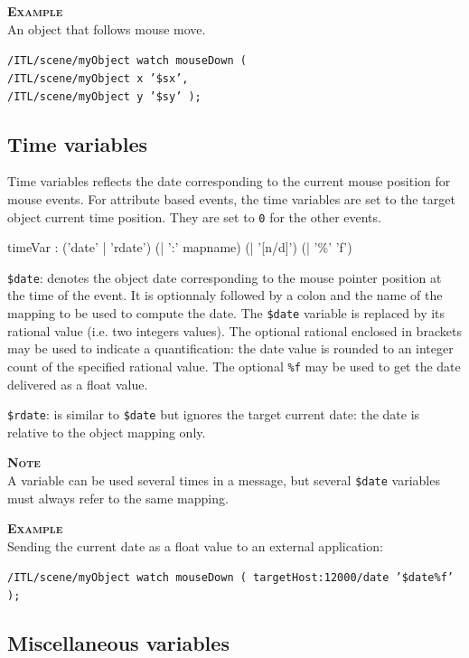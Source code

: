 \documentclass[a4paper,twoside]{report}
\newcommand{\subsublevel}[1]	{\subsection{#1}}
\newcommand{\OSC}[1]		{\texttt{#1}}
\newcommand{\values}[1]		{\texttt{#1}}
\newcommand{\example}		{\textbf{\hspace{-1.5cm}\textbf{\textsc{Example }}}}
\newcommand{\note}	[1]		{\vspace{2mm}\textbf{\hspace{-0.9cm}\textbf{\textsc{Note #1}}}}
\let\olditemize\itemize
\let\oldenditemize\enditemize
\renewenvironment{itemize} 	{\olditemize \setlength{\itemsep}{1mm}}{\oldenditemize}
\newcommand{\sample}	[1]			{\vspace{-2mm}\begin{center}\colorbox{mygrey}{
								\begin{minipage}[t]{0.9\columnwidth} 
								{\small \texttt{#1}}
								\end{minipage}}\end{center}}
\begin{document}
\example \\
An object that follows mouse move.\\
\sample{/ITL/scene/myObject watch mouseDown ( \\
\hspace*{3cm}/ITL/scene/myObject x '\$sx', \\
\hspace*{3cm}/ITL/scene/myObject y '\$sy' );}


\subsublevel{Time variables}
\label{timevar}

Time variables reflects the date corresponding to the current mouse position for mouse events. For attribute based events, the time variables are set to the target object current time position.
They are set to \values{0} for the other events. 

\begin{rail} 
timeVar :  ('date' | 'rdate') (| ':'  mapname) (| '[n/d]') (| '\%' 'f')
\end{rail}

\begin{itemize}
\item \OSC{\$date}: denotes the object date corresponding to the mouse pointer position at the time of the event. It is optionnaly followed by a colon and the name of the mapping to be used to compute the date. The \OSC{\$date} variable is replaced by its rational value (i.e. two integers values). The optional rational enclosed in brackets may be used to indicate a quantification: the date value is rounded to an integer count of the specified rational value. The optional \OSC{\%f} may be used to get the date delivered as a float value.
\item \OSC{\$rdate}: is similar to \OSC{\$date} but ignores the target current date: the date is relative to the object mapping only.
\end{itemize}

\note{} \\
A variable can be used several times in a message, but several \OSC{\$date} variables must always refer to the same mapping.

\example \\
Sending the current date as a float value to an external application:\\
\sample{/ITL/scene/myObject watch mouseDown ( targetHost:12000/date '\$date\%f' );}

\subsublevel{Miscellaneous variables}
\label{miscvar}
\end{document}
